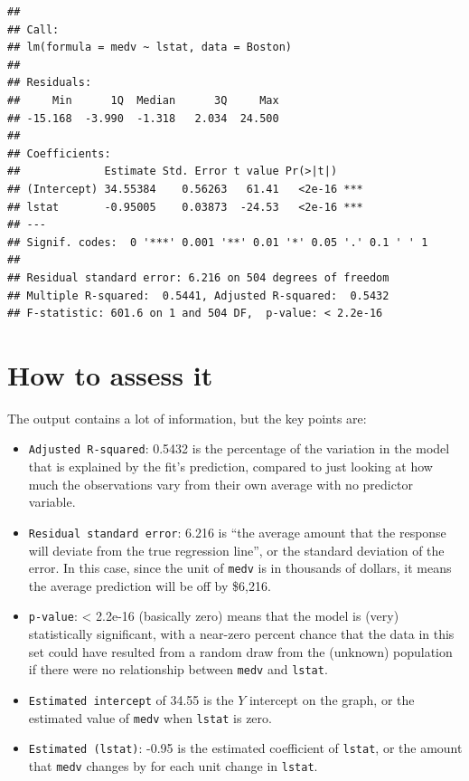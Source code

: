 \documentclass[
]{book}
\providecommand{\tightlist}{%
  \setlength{\itemsep}{0pt}\setlength{\parskip}{0pt}}
\begin{document}
\begin{verbatim}
## 
## Call:
## lm(formula = medv ~ lstat, data = Boston)
## 
## Residuals:
##     Min      1Q  Median      3Q     Max 
## -15.168  -3.990  -1.318   2.034  24.500 
## 
## Coefficients:
##             Estimate Std. Error t value Pr(>|t|)    
## (Intercept) 34.55384    0.56263   61.41   <2e-16 ***
## lstat       -0.95005    0.03873  -24.53   <2e-16 ***
## ---
## Signif. codes:  0 '***' 0.001 '**' 0.01 '*' 0.05 '.' 0.1 ' ' 1
## 
## Residual standard error: 6.216 on 504 degrees of freedom
## Multiple R-squared:  0.5441, Adjusted R-squared:  0.5432 
## F-statistic: 601.6 on 1 and 504 DF,  p-value: < 2.2e-16
\end{verbatim}

\hypertarget{how-to-assess-it}{%
\section{How to assess it}\label{how-to-assess-it}}

The output contains a lot of information, but the key points are:

\begin{itemize}
\tightlist
\item
  \texttt{Adjusted\ R-squared}: 0.5432 is the percentage of the variation in the model that is explained by the fit's prediction, compared to just looking at how much the observations vary from their own average with no predictor variable.
\item
  \texttt{Residual\ standard\ error}: 6.216 is ``the average amount that the response will deviate from the true regression line'', or the standard deviation of the error. In this case, since the unit of \texttt{medv} is in thousands of dollars, it means the average prediction will be off by \$6,216.
\item
  \texttt{p-value}: \textless{} 2.2e-16 (basically zero) means that the model is (very) statistically significant, with a near-zero percent chance that the data in this set could have resulted from a random draw from the (unknown) population if there were no relationship between \texttt{medv} and \texttt{lstat}.
\item
  \texttt{Estimated\ intercept} of 34.55 is the \(Y\) intercept on the graph, or the estimated value of \texttt{medv} when \texttt{lstat} is zero.
\item
  \texttt{Estimated\ (lstat)}: -0.95 is the estimated coefficient of \texttt{lstat}, or the amount that \texttt{medv} changes by for each unit change in \texttt{lstat}.
\end{itemize}
\end{document}
